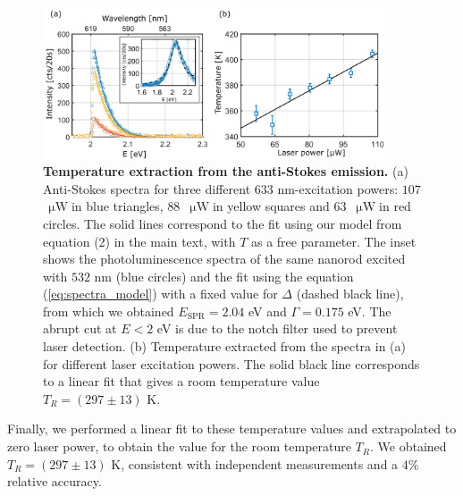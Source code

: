 \documentclass[journal=nalefd,manuscript=letter]{achemso}
\newcommand{\uW}{\ensuremath{\,\upmu\textrm{W}}}
\begin{document}
\begin{figure}[htp] \centering
\includegraphics[width=0.90\textwidth]{Figures/Supplementary/09_Error_vs_Wavelength/Temp_error.png}
\caption{\textbf{Temperature extraction from the anti-Stokes emission.} 
(a) Anti-Stokes spectra for three different $633$ nm-excitation powers: $107$ \uW in 
blue triangles, $88$ \uW in yellow squares and $63$ \uW in red circles. 
The solid lines correspond to the fit using our model from equation (2) in the main text, 
with $T$ as a free parameter. The inset shows the photoluminescence spectra of the same 
nanorod excited with $532$ nm (blue circles) and the fit using the equation 
(\ref{eq:spectra_model}) with a fixed value for $\Delta$ (dashed black line), from which 
we obtained $E_\textrm{SPR}=2.04$ eV and $\Gamma=0.175$ eV. The abrupt cut at $E<2$ eV is due to the
notch filter used to prevent laser detection.  
(b) Temperature extracted from the spectra in (a) for different laser excitation powers. 
The solid black line corresponds to a linear fit that gives a room temperature value $T_R = (297 \pm 13)$ K.}
\label{fig:as_fit}
\end{figure}

Finally, we performed a linear fit to these temperature values and extrapolated to 
zero laser power, to obtain the value for the room temperature $T_R$. 
We obtained $T_R = (297 \pm 13)$ K, consistent with independent measurements and a $4\%$ relative accuracy.


%
\end{document}
